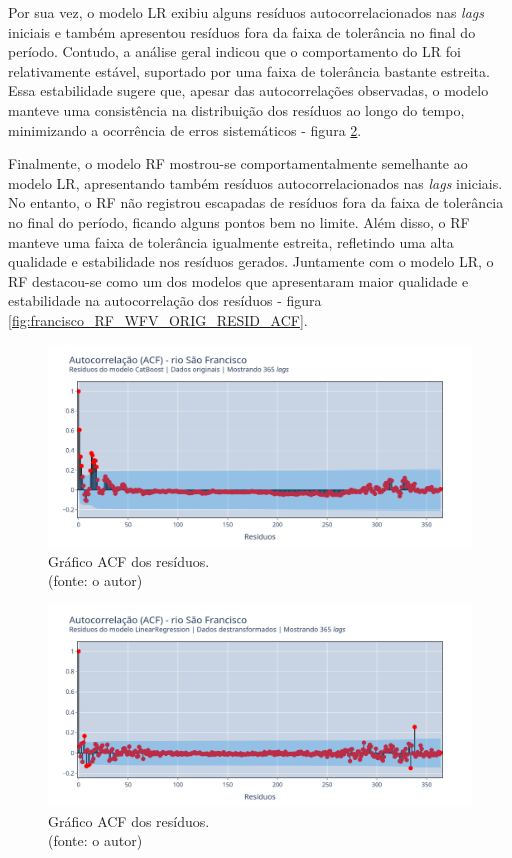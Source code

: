 Por sua vez, o modelo LR exibiu alguns resíduos autocorrelacionados nas \textit{lags} iniciais e também apresentou resíduos fora da faixa de tolerância no final do período. Contudo, a análise geral indicou que o comportamento do LR foi relativamente estável, suportado por uma faixa de tolerância bastante estreita. Essa estabilidade sugere que, apesar das autocorrelações observadas, o modelo manteve uma consistência na distribuição dos resíduos ao longo do tempo, minimizando a ocorrência de erros sistemáticos - figura \ref{fig:francisco_LR_WFV_LOG_RESID_ACF}.

Finalmente, o modelo RF mostrou-se comportamentalmente semelhante ao modelo LR, apresentando também resíduos autocorrelacionados nas \textit{lags} iniciais. No entanto, o RF não registrou escapadas de resíduos fora da faixa de tolerância no final do período, ficando alguns pontos bem no limite. Além disso, o RF manteve uma faixa de tolerância igualmente estreita, refletindo uma alta qualidade e estabilidade nos resíduos gerados. Juntamente com o modelo LR, o RF destacou-se como um dos modelos que apresentaram maior qualidade e estabilidade na autocorrelação dos resíduos - figura \ref{fig:francisco_RF_WFV_ORIG_RESID_ACF}.

\begin{figure}[!h]
\centering
\includegraphics[scale=0.33]{Figuras/rio_sao_francisco/wfv/CB/CB_WFV_ORIG_RESID_ACF.png}
\caption{Gráfico ACF dos resíduos.\\(fonte: o autor)}
\label{fig:francisco_CB_WFV_ORIG_RESID_ACF}
\end{figure}

\begin{figure}[!h]
\centering
\includegraphics[scale=0.33]{Figuras/rio_sao_francisco/wfv/LR/LR_WFV_LOG_RESID_ACF.png}
\caption{Gráfico ACF dos resíduos.\\(fonte: o autor)}
\label{fig:francisco_LR_WFV_LOG_RESID_ACF}
\end{figure}

